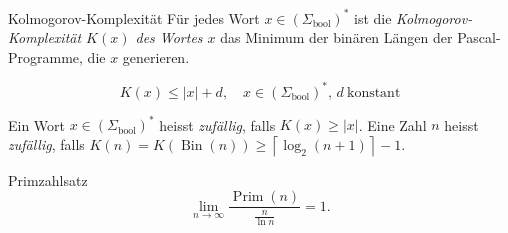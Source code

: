 \documentclass[a4paper,10pt]{article}
\DeclareMathOperator{\Bin}{Bin}
\begin{document}
\begin{mainbox}{Kolmogorov-Komplexität}
    Für jedes Wort $x \in (\Sigma_\textrm{bool})^*$ ist die \emph{Kolmogorov-Komplexität $K(x)$ des Wortes $x$} das Minimum der binären Längen der Pascal-Programme, die $x$ generieren.
\end{mainbox}
\begin{mainbox}{}
    \[K(x) \leq \left|x\right| + d,\quad x \in (\Sigma_\textrm{bool})^*,\, d\ \text{konstant}\]
\end{mainbox}
Ein Wort $x \in (\Sigma_\textrm{bool})^*$ heisst \emph{zufällig}, falls $K(x) \geq \left|x\right|$. Eine Zahl $n$ heisst \emph{zufällig}, falls $K(n) = K(\Bin(n)) \geq \left\lceil \log_2 (n + 1) \right\rceil - 1$.
\begin{subbox}{Primzahlsatz}
    \[\lim_{n \to \infty} \frac{\operatorname{Prim}(n)}{\frac{n}{\ln n}} = 1 \text{.}\]
\end{subbox}
\end{document}
